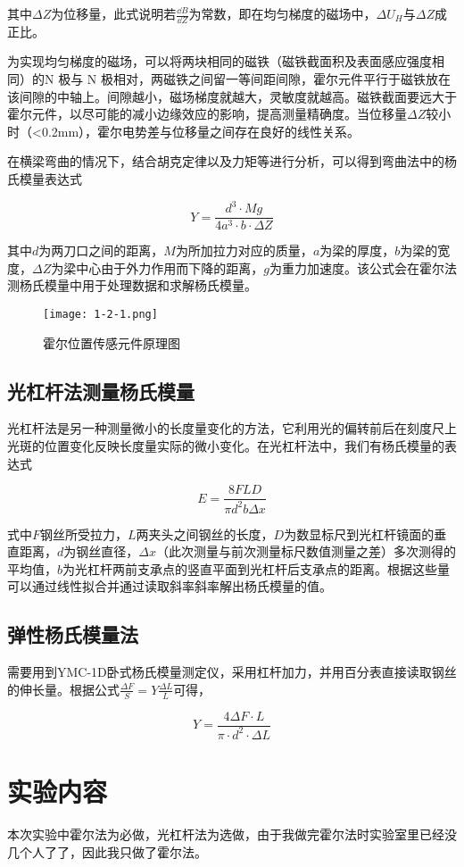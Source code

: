 \documentclass[12pt]{article}
\begin{document}
其中$ \Delta Z $为位移量，此式说明若$\frac{\dd B}{\dd Z}$为常数，即在均匀梯度的磁场中，$\Delta U_H$与$\Delta Z$成正比。

为实现均匀梯度的磁场，可以将两块相同的磁铁（磁铁截面积及表面感应强度相同）的N 极与 N 极相对，两磁铁之间留一等间距间隙，霍尔元件平行于磁铁放在该间隙的中轴上。间隙越小，磁场梯度就越大，灵敏度就越高。磁铁截面要远大于霍尔元件，以尽可能的减小边缘效应的影响，提高测量精确度。当位移量$\Delta Z$较小时（<0.2mm），霍尔电势差与位移量之间存在良好的线性关系。

在横梁弯曲的情况下，结合胡克定律以及力矩等进行分析，可以得到弯曲法中的杨氏模量表达式

\[
    Y=\frac{d^3\cdot Mg}{4a^3\cdot b\cdot\Delta Z}
\]

其中$d$为两刀口之间的距离，$M$为所加拉力对应的质量，$a$为梁的厚度，$b$为梁的宽度，$\Delta Z$为梁中心由于外力作用而下降的距离，$g$为重力加速度。该公式会在霍尔法测杨氏模量中用于处理数据和求解杨氏模量。

\begin{figure}[htbp]
    \centering
    \texttt{[image: 1-2-1.png]}
    \caption{霍尔位置传感元件原理图}
\end{figure}

\subsection{光杠杆法测量杨氏模量}
光杠杆法是另一种测量微小的长度量变化的方法，它利用光的偏转前后在刻度尺上光斑的位置变化反映长度量实际的微小变化。在光杠杆法中，我们有杨氏模量的表达式

\[
    E=\frac{8FLD}{\pi d^2b\Delta x}
\]

式中$F$钢丝所受拉力，$L$两夹头之间钢丝的长度，$D$为数显标尺到光杠杆镜面的垂直距离，$d$为钢丝直径，$\Delta x$（此次测量与前次测量标尺数值测量之差）多次测得的平均值，$b$为光杠杆两前支承点的竖直平面到光杠杆后支承点的距离。根据这些量可以通过线性拟合并通过读取斜率斜率解出杨氏模量的值。

\subsection{弹性杨氏模量法}
需要用到YMC-1D卧式杨氏模量测定仪，采用杠杆加力，并用百分表直接读取钢丝的伸长量。根据公式$\frac{\Delta F}{S}=Y\frac{\Delta L}{L}$可得，

\[
    Y=\frac{4 \Delta F \cdot L}{\pi \cdot d^2 \cdot \Delta L}
\]

\section{实验内容}
本次实验中霍尔法为必做，光杠杆法为选做，由于我做完霍尔法时实验室里已经没几个人了了，因此我只做了霍尔法。
\end{document}
